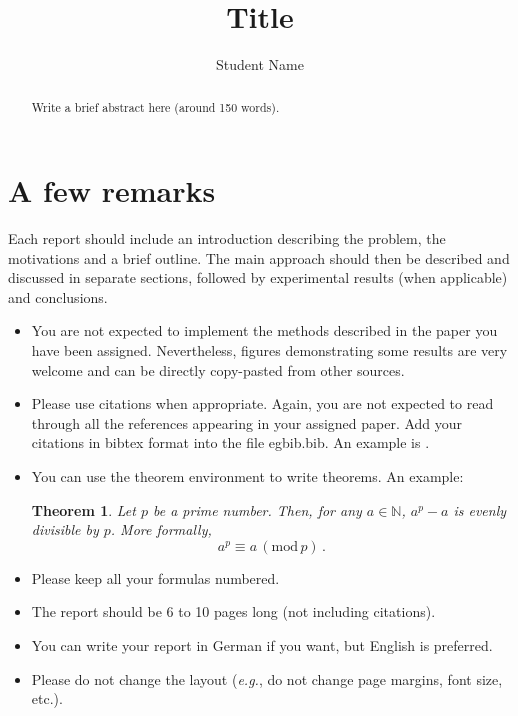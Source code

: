 \documentclass[a4paper,10pt]{article}
\title{Title} %
\author{Student Name} %
\institute{Your Department - Technische Universit\"{a}t M\"{u}nchen} %
\newtheorem{theorem}{Theorem}
\begin{document}
\maketitle

\begin{abstract}
Write a brief abstract here (around 150 words).
\end{abstract}

\section{A few remarks}

Each report should include an introduction describing the problem, the motivations and a brief outline. The main approach should then be described and discussed in separate sections, followed by experimental results (when applicable) and conclusions.

\begin{itemize}
\item You are not expected to implement the methods described in the paper you have been assigned. Nevertheless, figures demonstrating some results are very welcome and can be directly copy-pasted from other sources.
\item Please use citations when appropriate. Again, you are not expected to read through all the references appearing in your assigned paper. Add your citations in bibtex format into the file egbib.bib. An example is \cite{dijkstra59}.
\item You can use the theorem environment to write theorems. An example:
\begin{theorem}
\label{mytheorem}
Let $p$ be a prime number. Then, for any $a \in \mathbb{N}$, $a^p - a$ is evenly divisible by $p$. More formally,
\begin{equation}
a^p \equiv a \, (\mathrm{mod}\, p)\,.
\end{equation}
\end{theorem}
\item Please keep all your formulas numbered.
\item The report should be 6 to 10 pages long (not including citations).
\item You can write your report in German if you want, but English is preferred.
\item Please do not change the layout ({\em e.g.}, do not change page margins, font size, etc.).
\end{itemize}
	


\end{document}
